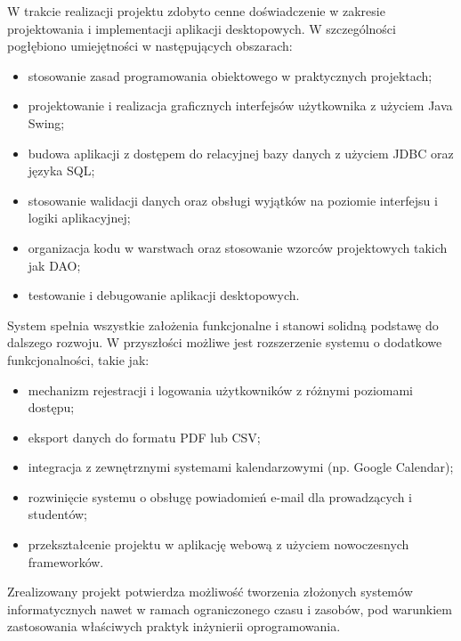 W trakcie realizacji projektu zdobyto cenne doświadczenie w zakresie projektowania i implementacji aplikacji desktopowych. W szczególności pogłębiono umiejętności w następujących obszarach:

\begin{itemize}
    \item stosowanie zasad programowania obiektowego w praktycznych projektach;
    \item projektowanie i realizacja graficznych interfejsów użytkownika z użyciem Java Swing;
    \item budowa aplikacji z dostępem do relacyjnej bazy danych z użyciem JDBC oraz języka SQL;
    \item stosowanie walidacji danych oraz obsługi wyjątków na poziomie interfejsu i logiki aplikacyjnej;
    \item organizacja kodu w warstwach oraz stosowanie wzorców projektowych takich jak DAO;
    \item testowanie i debugowanie aplikacji desktopowych.
\end{itemize}

System spełnia wszystkie założenia funkcjonalne i stanowi solidną podstawę do dalszego rozwoju. W przyszłości możliwe jest rozszerzenie systemu o dodatkowe funkcjonalności, takie jak:

\begin{itemize}
    \item mechanizm rejestracji i logowania użytkowników z różnymi poziomami dostępu;
    \item eksport danych do formatu PDF lub CSV;
    \item integracja z zewnętrznymi systemami kalendarzowymi (np. Google Calendar);
    \item rozwinięcie systemu o obsługę powiadomień e-mail dla prowadzących i studentów;
    \item przekształcenie projektu w aplikację webową z użyciem nowoczesnych frameworków.
\end{itemize}

Zrealizowany projekt potwierdza możliwość tworzenia złożonych systemów informatycznych nawet w ramach ograniczonego czasu i zasobów, pod warunkiem zastosowania właściwych praktyk inżynierii oprogramowania.

